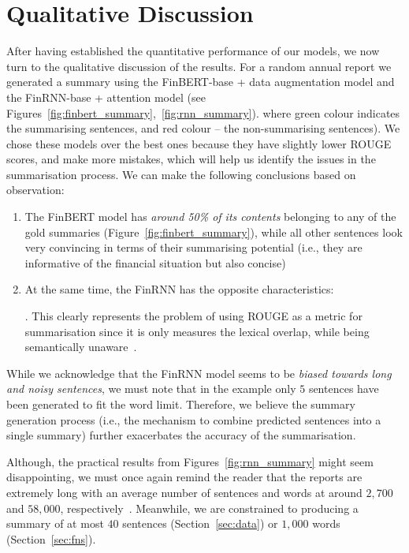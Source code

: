 \section{Qualitative Discussion}\label{sec:qualitative-discussion}
After having established the quantitative performance of our models, we now turn to the qualitative discussion of the results.
For a random annual report we generated a summary using the FinBERT-base + data augmentation model and
the FinRNN-base + attention model (see Figures~\ref{fig:finbert_summary},~\ref{fig:rnn_summary}).
where green colour indicates the summarising sentences, and red colour -- the non-summarising sentences).
We chose these models over the best ones because they have slightly lower ROUGE scores, and make more mistakes, which will help us identify the issues in the summarisation process.
We can make the following conclusions based on observation:
\begin{enumerate}
    \item The FinBERT model has \emph{around 50\% of its contents} belonging to any of the gold summaries (Figure~\ref{fig:finbert_summary}),
        while all other sentences look very convincing in terms of their summarising potential (i.e., they are informative of the financial situation but also concise)
    \item At the same time, the FinRNN has the opposite characteristics:
    .
    This clearly represents the problem of using ROUGE as a metric for summarisation since it is only measures the lexical overlap, while being semantically unaware~\cite{akter-etal-2022-revisiting}.
\end{enumerate}
While we acknowledge that the FinRNN model seems to be \emph{biased towards long and noisy sentences}, we must note that in the example
only $5$ sentences have been generated to fit the word limit.
Therefore, we believe the summary generation process (i.e., the mechanism to combine predicted sentences into a single summary) further
exacerbates the accuracy of the summarisation.

Although, the practical results from Figures~\ref{fig:rnn_summary} might seem disappointing, we must once again remind the reader that the reports are extremely
long with an average number of sentences and words at around $2,700$ and $58,000$, respectively~\cite{litvak-vanetik-2021-summarization}.
Meanwhile, we are constrained to producing a summary of at most $40$ sentences (Section~\ref{sec:data}) or $1,000$ words (Section~\ref{sec:fns}).

